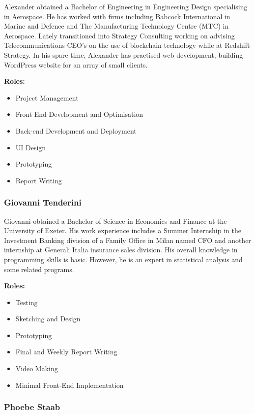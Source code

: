 \documentclass[fontsize=10pt]{extarticle}
\numberwithin{figure}{section} %
\providecommand{\tightlist}{%
  \setlength{\itemsep}{0pt}\setlength{\parskip}{0pt}}
\begin{document}
Alexander obtained a Bachelor of Engineering in Engineering Design
specialising in Aerospace. He has worked with firms including Babcock
International in Marine and Defence and The Manufacturing Technology
Centre (MTC) in Aerospace. Lately transitioned into Strategy Consulting
working on advising Telecommunications CEO's on the use of blockchain
technology while at Redshift Strategy. In his spare time, Alexander has
practised web development, building WordPress website for an array of
small clients.

\textbf{Roles:}

\begin{itemize}
\tightlist
\item
  Project Management
\item
  Front End-Development and Optimisation
\item
  Back-end Development and Deployment
\item
  UI Design
\item
  Prototyping
\item
  Report Writing
\end{itemize}

\hypertarget{giovanni-tenderini}{%
\subsubsection{Giovanni Tenderini}\label{giovanni-tenderini}}

Giovanni obtained a Bachelor of Science in Economics and Finance at the
University of Exeter. His work experience includes a Summer Internship
in the Investment Banking division of a Family Office in Milan named CFO
and another internship at Generali Italia insurance sales division. His
overall knowledge in programming skills is basic. However, he is an
expert in statistical analysis and some related programs.

\textbf{Roles:}

\begin{itemize}
\tightlist
\item
  Testing
\item
  Sketching and Design
\item
  Prototyping
\item
  Final and Weekly Report Writing
\item
  Video Making
\item
  Minimal Front-End Implementation
\end{itemize}

\hypertarget{phoebe-staab}{%
\subsubsection{Phoebe Staab}\label{phoebe-staab}}
\end{document}
